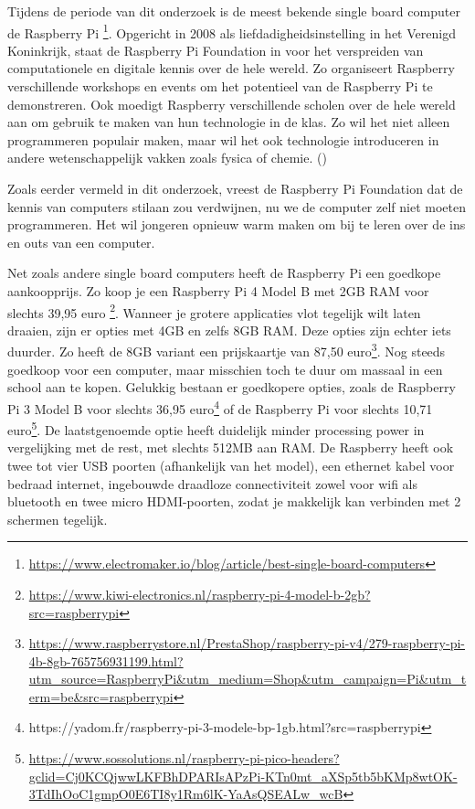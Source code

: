 Tijdens de periode van dit onderzoek is de meest bekende single board computer de Raspberry Pi \footnote{\url{https://www.electromaker.io/blog/article/best-single-board-computers}}. Opgericht in 2008  als liefdadigheidsinstelling in het Verenigd Koninkrijk, staat de Raspberry Pi Foundation in voor het verspreiden van computationele en digitale kennis over de hele wereld.
Zo organiseert Raspberry verschillende workshops en events om het potentieel van de Raspberry Pi te demonstreren. Ook moedigt Raspberry verschillende scholen over de hele wereld aan om gebruik te maken van hun technologie in de klas. Zo wil het niet alleen programmeren populair maken, maar wil het ook technologie introduceren in andere wetenschappelijk vakken zoals fysica of chemie.
(\cite{Foundation})


Zoals eerder vermeld in dit onderzoek, vreest de Raspberry Pi Foundation dat de kennis van computers stilaan zou verdwijnen, nu we de computer zelf niet moeten programmeren. Het wil jongeren opnieuw warm maken om bij te leren over de ins en outs van een computer.

Net zoals andere single board computers heeft de Raspberry Pi een goedkope aankoopprijs. Zo koop je een Raspberry Pi 4 Model B met 2GB RAM voor slechts 39,95 euro \footnote{\url{https://www.kiwi-electronics.nl/raspberry-pi-4-model-b-2gb?src=raspberrypi}}. Wanneer je grotere applicaties vlot tegelijk wilt laten draaien, zijn er opties met 4GB en zelfs 8GB RAM. Deze opties zijn echter iets duurder. Zo heeft de 8GB variant een prijskaartje van 87,50 euro\footnote{\url{https://www.raspberrystore.nl/PrestaShop/raspberry-pi-v4/279-raspberry-pi-4b-8gb-765756931199.html?utm_source=RaspberryPi&utm_medium=Shop&utm_campaign=Pi&utm_term=be&src=raspberrypi}}. Nog steeds goedkoop voor een computer, maar misschien toch te duur om massaal in een school aan te kopen. Gelukkig bestaan er goedkopere opties, zoals de Raspberry Pi 3 Model B voor slechts 36,95 euro\footnote{https://yadom.fr/raspberry-pi-3-modele-bp-1gb.html?src=raspberrypi} of de Raspberry Pi voor slechts 10,71 euro\footnote{\url{https://www.sossolutions.nl/raspberry-pi-pico-headers?gclid=Cj0KCQjwwLKFBhDPARIsAPzPi-KTn0mt_aXSp5tb5bKMp8wtOK-3TdIhOoC1gmpO0E6TI8y1Rm6lK-YaAsQSEALw_wcB}}. De laatstgenoemde optie heeft duidelijk minder processing power in vergelijking met de rest, met slechts 512MB aan RAM.
De Raspberry heeft ook twee tot vier USB poorten (afhankelijk van het model), een ethernet kabel voor bedraad internet, ingebouwde draadloze connectiviteit zowel voor wifi als bluetooth en twee micro HDMI-poorten, zodat je makkelijk kan verbinden met 2 schermen tegelijk.

